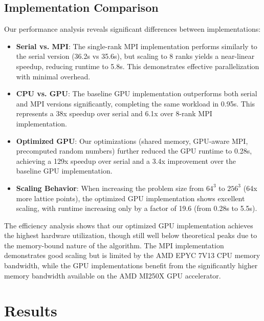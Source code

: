 \documentclass{article}
\begin{document}
\subsection{Implementation Comparison}
Our performance analysis reveals significant differences between implementations:

\begin{itemize}
    \item \textbf{Serial vs. MPI}: The single-rank MPI implementation performs similarly to the serial version (36.2s vs 35.6s), but scaling to 8 ranks yields a near-linear speedup, reducing runtime to 5.8s. This demonstrates effective parallelization with minimal overhead.
    
    \item \textbf{CPU vs. GPU}: The baseline GPU implementation outperforms both serial and MPI versions significantly, completing the same workload in 0.95s. This represents a 38x speedup over serial and 6.1x over 8-rank MPI implementation.
    
    \item \textbf{Optimized GPU}: Our optimizations (shared memory, GPU-aware MPI, precomputed random numbers) further reduced the GPU runtime to 0.28s, achieving a 129x speedup over serial and a 3.4x improvement over the baseline GPU implementation.
    
    \item \textbf{Scaling Behavior}: When increasing the problem size from $64^3$ to $256^3$ (64x more lattice points), the optimized GPU implementation shows excellent scaling, with runtime increasing only by a factor of 19.6 (from 0.28s to 5.5s).
\end{itemize}

The efficiency analysis shows that our optimized GPU implementation achieves the highest hardware utilization, though still well below theoretical peaks due to the memory-bound nature of the algorithm. The MPI implementation demonstrates good scaling but is limited by the AMD EPYC 7V13 CPU memory bandwidth, while the GPU implementations benefit from the significantly higher memory bandwidth available on the AMD MI250X GPU accelerator.

\section{Results}
\end{document}
